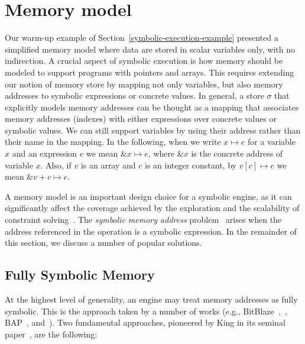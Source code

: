 

\section{Memory model}
\label{memory-model}

Our warm-up example of Section~\ref{symbolic-execution-example} presented a simplified memory model where data are stored in scalar variables only, with no indirection. A crucial aspect of symbolic execution is how memory should be modeled to support programs with pointers and arrays. This requires extending our notion of memory store by mapping not only variables, but also memory addresses to symbolic expressions or concrete values. In general, a store $\sigma$ that explicitly models memory addresses can be thought as a mapping that associates memory addresses (indexes) with either expressions over concrete values or symbolic values. We can still support variables by using their address rather than their name in the mapping. In the following, when we write $x\mapsto e$ for a variable $x$ and an expression $e$ we mean $\&x\mapsto e$, where $\&x$ is the concrete address of variable $x$. Also, if $v$ is an array and $c$ is an integer constant, by $v[c]\mapsto e$ we mean $\&v+c\mapsto e$.

A memory model is an important design choice for a symbolic engine, as it can significantly affect the coverage achieved by the exploration and the scalability of constraint solving~\cite{CS-CACM13}.
%
The {\em symbolic memory address} problem~\cite{SAB-SP10} arises when the address referenced in the operation is a symbolic expression. In the remainder of this section, we discuss a number of popular solutions.

\subsection{Fully Symbolic Memory}
\label{ss:fully-symbolic-memory}

At the highest level of generality, an engine may treat memory addresses as fully symbolic. This is the approach taken by a number of works (e.g., {\sc BitBlaze}~\cite{BITBLAZE-ICISS08},~\cite{TLL-CAV10}, {\sc BAP}~\cite{BAP-CAV11}, and~\cite{TS-ATVA14}). Two fundamental approaches, pioneered by King in its seminal paper~\cite{K-CACM76}, are the following:

